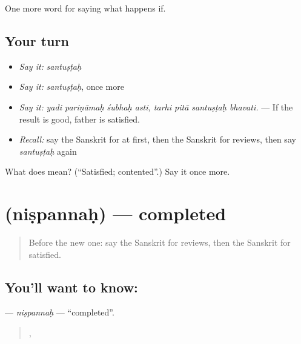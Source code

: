 \begin{grammarlens}[title={What you've built}]
One more word for saying what happens if.
\end{grammarlens}

\subsection*{Your turn}
\begin{itemize}
\raggedright
  \item \emph{Say it:} \emph{santuṣṭaḥ}
  \item \emph{Say it:} \emph{santuṣṭaḥ}, once more
  \item \emph{Say it:} \emph{yadi pariṇāmaḥ śubhaḥ asti, tarhi pitā santuṣṭaḥ bhavati.} — If the result is good, father is satisfied.
  \item \emph{Recall:} say the Sanskrit for at first, then the Sanskrit for reviews, then say \emph{santuṣṭaḥ} again
\end{itemize}

\begin{tcolorbox}[breakable,colback=teal!4,colframe=teal!35!black,title={Before you move on}]
What does  mean? (\textquotedblleft{}Satisfied; contented\textquotedblright{}.) Say it once more.
\end{tcolorbox}
\section[\texorpdfstring{\sk{निष्पन्नः} (niṣpannaḥ)}{निष्पन्नः (niṣpannaḥ)}]{ (niṣpannaḥ) — completed}

\label{lesson:SA-C546-nispannah}



\begin{quote}
Before the new one: say the Sanskrit for reviews, then the Sanskrit for satisfied.
\end{quote}

\subsection*{You'll want to know: }
\textbf{} — \emph{niṣpannaḥ} — \textquotedblleft{}completed\textquotedblright{}.

\begin{quote}
   ,    
\end{quote}

